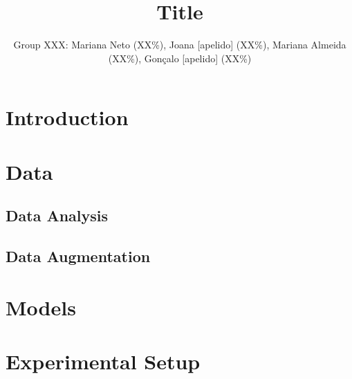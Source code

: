 \documentclass[twocolumn,10pt]{article}
\title{Title}
\author{Group XXX: Mariana Neto (XX\%), Joana [apelido] (XX\%), Mariana Almeida (XX\%), Gonçalo [apelido] (XX\%)}
\begin{document}
\maketitle


\section{Introduction}

\section{Data}

\subsection{Data Analysis}

\subsection{Data Augmentation}

\section{Models}

\section{Experimental Setup}
\end{document}
